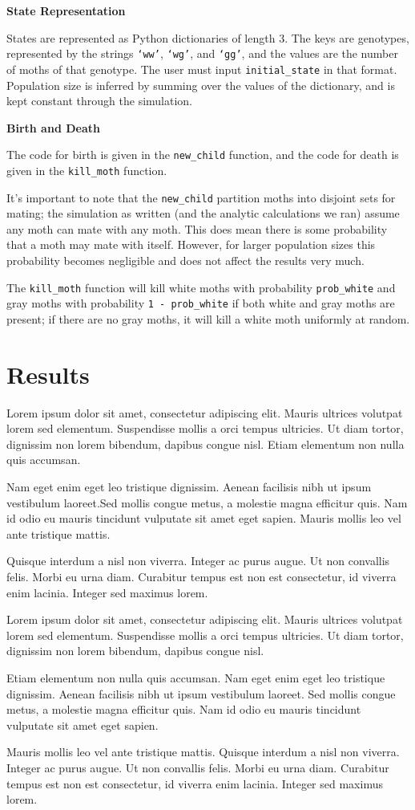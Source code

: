 \documentclass[leqno]{article}
\begin{document}
\textbf{State Representation}

States are represented as Python dictionaries of length $3$. The keys are genotypes, represented by the strings {\tt `ww'}, {\tt `wg'}, and {\tt `gg'}, and the values are the number of moths of that genotype. The user must input {\tt initial\_state} in that format. Population size is inferred by summing over the values of the dictionary, and is kept constant through the simulation.

\textbf{Birth and Death}

The code for birth is given in the {\tt new\_child} function, and the code for death is given in the {\tt kill\_moth} function.

It's important to note that the {\tt new\_child} partition moths into disjoint sets for mating; the simulation as written (and the analytic calculations we ran) assume any moth can mate with any moth. This does mean there is some probability that a moth may mate with itself. However, for larger population sizes this probability becomes negligible and does not affect the results very much.

The {\tt kill\_moth} function will kill white moths with probability {\tt prob\_white} and gray moths with probability {\tt 1\ -\ prob\_white} if both white and gray moths are present; if there are no gray moths, it will kill a white moth uniformly at random.

\newpage

\section{Results}

Lorem ipsum dolor sit amet, consectetur adipiscing elit. Mauris ultrices volutpat lorem sed elementum. Suspendisse mollis a orci tempus ultricies. Ut diam tortor, dignissim non lorem bibendum, dapibus congue nisl. Etiam elementum non nulla quis accumsan. 

Nam eget enim eget leo tristique dignissim. Aenean facilisis nibh ut ipsum vestibulum laoreet.Sed mollis congue metus, a molestie magna efficitur quis. Nam id odio eu mauris tincidunt vulputate sit amet eget sapien. Mauris mollis leo vel ante tristique mattis. 

Quisque interdum a nisl non viverra. Integer ac purus augue. Ut non convallis felis. Morbi eu urna diam. Curabitur tempus est non est consectetur, id viverra enim lacinia. Integer sed maximus lorem.

Lorem ipsum dolor sit amet, consectetur adipiscing elit. Mauris ultrices volutpat lorem sed elementum. Suspendisse mollis a orci tempus ultricies. Ut diam tortor, dignissim non lorem bibendum, dapibus congue nisl. 

Etiam elementum non nulla quis accumsan. Nam eget enim eget leo tristique dignissim. Aenean facilisis nibh ut ipsum vestibulum laoreet. Sed mollis congue metus, a molestie magna efficitur quis. Nam id odio eu mauris tincidunt vulputate sit amet eget sapien. 

Mauris mollis leo vel ante tristique mattis. Quisque interdum a nisl non viverra. Integer ac purus augue. Ut non convallis felis. Morbi eu urna diam. Curabitur tempus est non est consectetur, id viverra enim lacinia. Integer sed maximus lorem.
\end{document}

